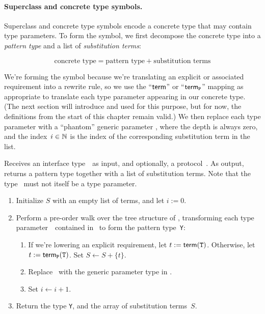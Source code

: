 \documentclass[../generics]{subfiles}
\begin{document}
\paragraph{Superclass and concrete type symbols.}
Superclass and concrete type symbols encode a concrete type that may contain type parameters. To form the symbol, we first decompose the concrete type into a \emph{pattern type} and a list of \emph{substitution terms}:
\begin{ceqn}
\[\text{concrete type} = \text{pattern type} + \text{substitution terms}\]
\end{ceqn}
We're forming the symbol because we're translating an explicit or associated requirement into a rewrite rule, so we use the ``$\mathsf{term}$'' or ``$\mathsf{term}_{\texttt{P}}$'' mapping as appropriate to translate each type parameter appearing in our concrete type. (The next section will introduce  and  used for this purpose, but for now, the definitions from the start of this chapter remain valid.) We then replace each type parameter with a ``phantom'' generic parameter , where the depth is always zero, and the index~$i\in\mathbb{N}$ is the index of the corresponding substitution term in the list.

\begin{algorithm}\label{concretesymbolcons}
Receives an interface type~\tX\ as input, and optionally, a protocol~\tP. As output, returns a pattern type together with a list of substitution terms. Note that the type \tX\ must not itself be a type parameter.
\begin{enumerate}
\item Initialize $S$ with an empty list of terms, and let $i:=0$.
\item Perform a pre-order walk over the tree structure of \tT, transforming each type parameter~\tT\ contained in \tX\ to form the pattern type~\texttt{Y}:
\begin{enumerate}
\item If we're lowering an explicit requirement, let $t := \mathsf{term}(\texttt{T})$. Otherwise, let $t := \mathsf{term}_{\texttt{P}}(\texttt{T})$. Set $S\leftarrow S + \{t\}$.
\item Replace \tT\ with the generic parameter type  in \tX.
\item Set $i\leftarrow i + 1$.
\end{enumerate}
\item Return the type \texttt{Y}, and the array of substitution terms~$S$.
\end{enumerate}
\end{algorithm}
\end{document}
